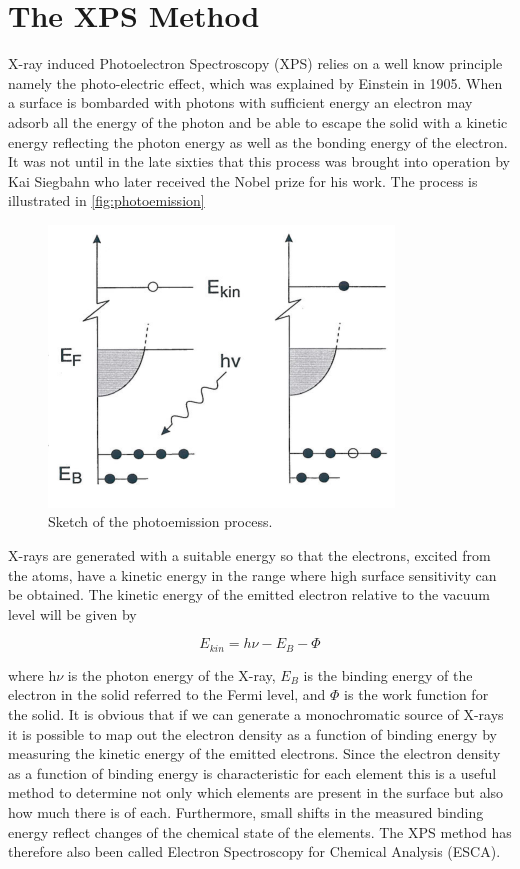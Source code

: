 \chapter{The XPS Method}\label{ch:xps}
X-ray induced Photoelectron Spectroscopy (XPS) relies on a well know principle namely the photo-electric effect, which was explained by Einstein in 1905. When a surface is bombarded with photons with sufficient energy an electron may adsorb all the energy of the photon and be able to escape the solid with a kinetic energy reflecting the photon energy as well as the bonding energy of the electron. It was not until in the late sixties that this process was brought into operation by Kai Siegbahn who later received the Nobel prize for his work. The process is illustrated in \autoref{fig:photoemission}

\begin{figure}[h!]
	\begin{center}
	\includegraphics[scale=3]{figures/04_01.png}
	\caption{Sketch of the photoemission process.}
	\label{fig:photoemission}
	\end{center}
\end{figure}

X-rays are generated with a suitable  energy so that the electrons, excited from the atoms, have a kinetic energy in  the range where high surface sensitivity can be obtained. The kinetic energy of the emitted electron relative to the vacuum level will be given by

\begin{equation}
E_{kin}=h\nu-E_B-\Phi
\end{equation}

\noindent where h$\nu$ is the photon energy of the X-ray, $E_B$ is the binding energy of the electron in the solid referred to the Fermi level, and $\Phi$ is the work  function for the solid. It is obvious that if we can generate a monochromatic source of X-rays it is possible to map out the electron density as a function of binding energy by measuring the kinetic energy of the emitted electrons. Since the electron density as a function of binding energy is characteristic for each element this is a useful method to determine not only which elements are present in the surface but also how much there is  of each. Furthermore, small shifts in the measured binding energy  reflect changes of the chemical state of the elements. The XPS method has therefore also been called Electron Spectroscopy for Chemical Analysis (ESCA).

